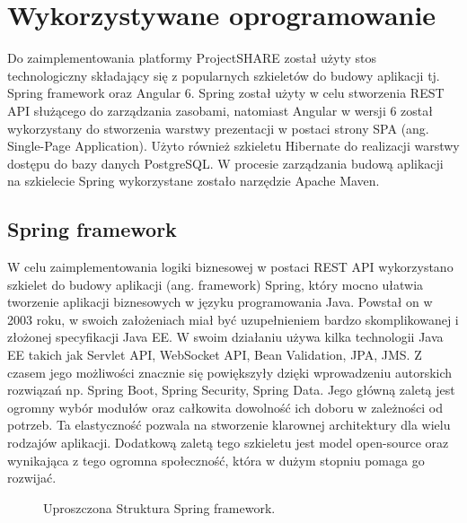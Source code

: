 \section{Wykorzystywane oprogramowanie}
\label{sec:wykorzystywaneOprogramowanie}
Do zaimplementowania platformy ProjectSHARE został użyty stos technologiczny składający się z popularnych szkieletów do budowy aplikacji tj. Spring framework oraz Angular 6. Spring został użyty w celu stworzenia REST API służącego do zarządzania zasobami, natomiast Angular w wersji 6 został wykorzystany do stworzenia warstwy prezentacji w postaci strony SPA (ang. Single-Page Application). Użyto również szkieletu Hibernate do realizacji warstwy dostępu do bazy danych PostgreSQL. W procesie zarządzania budową aplikacji na szkielecie Spring wykorzystane zostało narzędzie Apache Maven.

\subsection{Spring framework}
\label{subsec:springFramework}

W celu zaimplementowania logiki biznesowej w postaci REST API wykorzystano szkielet do budowy aplikacji (ang. framework) Spring, który mocno ułatwia tworzenie aplikacji biznesowych w języku programowania Java. Powstał on w 2003 roku, w swoich założeniach miał być uzupełnieniem bardzo skomplikowanej i złożonej specyfikacji Java EE. W swoim działaniu używa kilka technologii Java EE takich jak Servlet API, WebSocket API, Bean Validation, JPA, JMS. Z czasem jego możliwości znacznie się powiększyły dzięki wprowadzeniu autorskich rozwiązań np. Spring Boot, Spring Security, Spring Data. Jego główną zaletą jest ogromny wybór modułów oraz całkowita dowolność ich doboru w zależności od potrzeb. Ta elastyczność pozwala na stworzenie klarownej architektury dla wielu rodzajów aplikacji. Dodatkową zaletą tego szkieletu jest model open-source oraz wynikająca z tego ogromna społeczność, która w dużym stopniu pomaga go rozwijać. 

\begin{figure}[h!]
	\caption{Uproszczona Struktura Spring framework. }
	\centering
	\label{fig:springStructure}
\end{figure}


